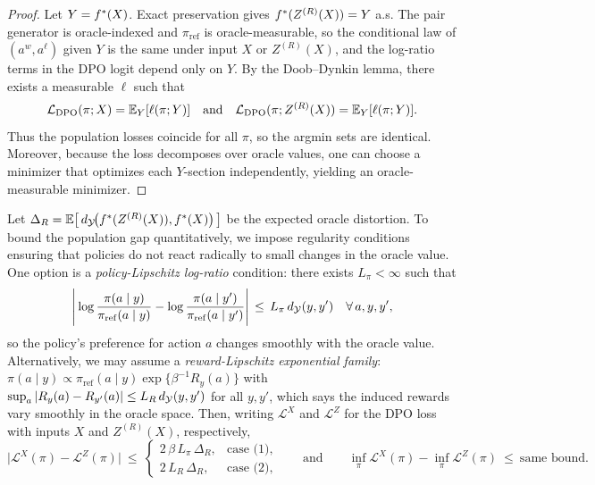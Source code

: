 \begin{proof}
Let $Y=f^{\ast}(X)$. Exact preservation gives $f^{\ast}(Z^{(R)}(X))=Y$ a.s. The pair generator is oracle-indexed and $\pi_{\mathrm{ref}}$ is oracle-measurable, so the conditional law of $(a^w,a^\ell)$ given $Y$ is the same under input $X$ or $Z^{(R)}(X)$, and the log-ratio terms in the DPO logit depend only on $Y$. By the Doob--Dynkin lemma, there exists a measurable $\ell$ such that
\[
\mathcal{L}_{\mathrm{DPO}}(\pi; X)=\mathbb{E}_Y[\ell(\pi;Y)]
\quad\text{and}\quad
\mathcal{L}_{\mathrm{DPO}}(\pi; Z^{(R)}(X))=\mathbb{E}_Y[\ell(\pi;Y)].
\]
Thus the population losses coincide for all $\pi$, so the argmin sets are identical. Moreover, because the loss decomposes over oracle values, one can choose a minimizer that optimizes each $Y$-section independently, yielding an oracle-measurable minimizer.
\end{proof}

\begin{theorem}\label{thm:dpo-gap}
Let $\Delta_R=\mathbb{E}\big[\,d_{\mathcal{Y}}\!\big(f^{\ast}(Z^{(R)}(X)),f^{\ast}(X)\big)\,\big]$ be the expected oracle distortion. To bound the population gap quantitatively, we impose regularity conditions ensuring that policies do not react radically to small changes in the oracle value. One option is a \emph{policy-Lipschitz log-ratio} condition: there exists $L_\pi<\infty$ such that
\[
\Bigg|\log\frac{\pi(a\mid y)}{\pi_{\mathrm{ref}}(a\mid y)}-\log\frac{\pi(a\mid y')}{\pi_{\mathrm{ref}}(a\mid y')}\Bigg|\,\le\,L_\pi\,d_{\mathcal{Y}}(y,y')\quad\forall\,a,y,y',
\]
so the policy's preference for action $a$ changes smoothly with the oracle value. Alternatively, we may assume a \emph{reward-Lipschitz exponential family}: $\pi(a\mid y)\propto \pi_{\mathrm{ref}}(a\mid y)\exp\{\beta^{-1}R_y(a)\}$ with $\sup_a|R_y(a)-R_{y'}(a)|\le L_R\,d_{\mathcal{Y}}(y,y')$ for all $y,y'$, which says the induced rewards vary smoothly in the oracle space.
Then, writing $\mathcal L^{X}$ and $\mathcal L^{Z}$ for the DPO loss with inputs $X$ and $Z^{(R)}(X)$, respectively,
\[
\big|\mathcal L^{X}(\pi)-\mathcal L^{Z}(\pi)\big|
\ \le\
\begin{cases}
2\,\beta\,L_\pi\,\Delta_R,&\text{case (1)},\\[2pt]
2\,L_R\,\Delta_R,&\text{case (2)},
\end{cases}
\qquad
\text{and}\qquad
\inf_\pi \mathcal L^{X}(\pi)-\inf_\pi \mathcal L^{Z}(\pi)\ \le\ \text{same bound}.
\]
\end{theorem}

